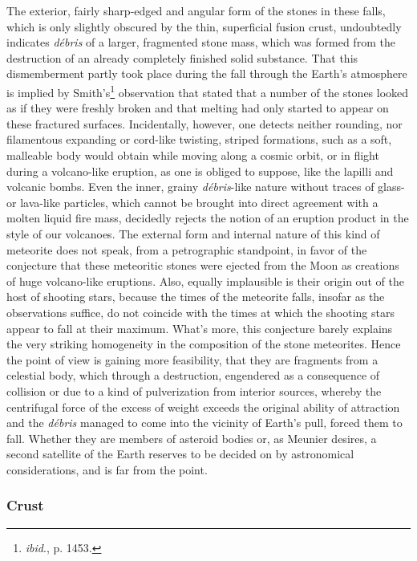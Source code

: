 \documentclass[a4paper, 12pt, oneside]{article}
\begin{document}
The exterior, fairly sharp-edged and angular form of the stones in these falls, which is only slightly obscured by the thin, superficial fusion crust, undoubtedly indicates \emph{débris} of a larger, fragmented stone mass, which was formed from the destruction of an already completely finished solid substance. That this dismemberment partly took place during the fall through the Earth's atmosphere is implied by Smith's\footnote{\emph{ibid}., p. 1453.} observation that stated that a number of the stones looked as if they were freshly broken and that melting had only started to appear on these fractured surfaces. Incidentally, however, one detects neither rounding, nor filamentous expanding or cord-like twisting, striped formations, such as a soft, malleable body would obtain while moving along a cosmic orbit, or in flight during a volcano-like eruption, as one is obliged to suppose, like the lapilli and volcanic bombs. Even the inner, grainy \emph{débris}-like nature without traces of glass- or lava-like particles, which cannot be brought into direct agreement with a molten liquid fire mass, decidedly rejects the notion of an eruption product in the style of our volcanoes. The external form and internal nature of this kind of meteorite does not speak, from a petrographic standpoint, in favor of the conjecture that these meteoritic stones were ejected from the Moon as creations of huge volcano-like eruptions. Also, equally implausible is their origin out of the host of shooting stars, because the times of the meteorite falls, insofar as the observations suffice, do not coincide with the times at which the shooting stars appear to fall at their maximum. What's more, this conjecture barely explains the very striking homogeneity in the composition of the stone meteorites. Hence the point of view is gaining more feasibility, that they are fragments from a celestial body, which through a destruction, engendered as a consequence of collision or due to a kind of pulverization from interior sources, whereby the centrifugal force of the excess of weight exceeds the original ability of attraction and the \emph{débris} managed to come into the vicinity of Earth's pull, forced them to fall. Whether they are members of asteroid bodies or, as Meunier desires, a second satellite of the Earth reserves to be decided on by astronomical considerations, and is far from the point.
\clearpage
\subsubsection{Crust}
\end{document}
